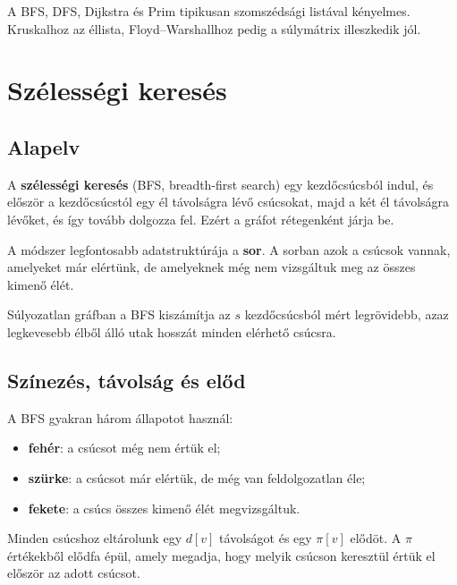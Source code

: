 \begin{center}

\end{center}

A BFS, DFS, Dijkstra és Prim tipikusan szomszédsági listával kényelmes. Kruskalhoz az éllista, Floyd--Warshallhoz pedig a súlymátrix illeszkedik jól.

\section{Szélességi keresés}

\subsection{Alapelv}

A \textbf{szélességi keresés} (BFS, breadth-first search) egy kezdőcsúcsból indul, és először a kezdőcsúcstól egy él távolságra lévő csúcsokat, majd a két él távolságra lévőket, és így tovább dolgozza fel. Ezért a gráfot rétegenként járja be.

A módszer legfontosabb adatstruktúrája a \textbf{sor}. A sorban azok a csúcsok vannak, amelyeket már elértünk, de amelyeknek még nem vizsgáltuk meg az összes kimenő élét.

\begin{summarybox}
Súlyozatlan gráfban a BFS kiszámítja az $s$ kezdőcsúcsból mért legrövidebb, azaz legkevesebb élből álló utak hosszát minden elérhető csúcsra.
\end{summarybox}



\subsection{Színezés, távolság és előd}

A BFS gyakran három állapotot használ:

\begin{itemize}
  \item \textbf{fehér}: a csúcsot még nem értük el;
  \item \textbf{szürke}: a csúcsot már elértük, de még van feldolgozatlan éle;
  \item \textbf{fekete}: a csúcs összes kimenő élét megvizsgáltuk.
\end{itemize}

Minden csúcshoz eltárolunk egy $d[v]$ távolságot és egy $\pi[v]$ elődöt. A $\pi$ értékekből elődfa épül, amely megadja, hogy melyik csúcson keresztül értük el először az adott csúcsot.

